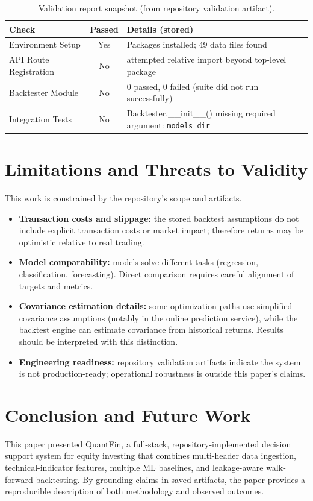 \documentclass{svproc}
\begin{document}
\begin{table}[h!]
\centering
\caption{Validation report snapshot (from repository validation artifact).}
\label{tab:validation}
\begin{tabular}{|l|c|p{8.0cm}|}
\hline
Check & Passed & Details (stored) \\
\hline
Environment Setup & Yes & Packages installed; 49 data files found \\
API Route Registration & No & attempted relative import beyond top-level package \\
Backtester Module & No & 0 passed, 0 failed (suite did not run successfully) \\
Integration Tests & No & Backtester.\_\_init\_\_() missing required argument: \texttt{models\_dir} \\
\hline
\end{tabular}
\end{table}

\section{Limitations and Threats to Validity}\label{sec:limits}
This work is constrained by the repository's scope and artifacts.
\begin{itemize}
\item \textbf{Transaction costs and slippage:} the stored backtest assumptions do not include explicit transaction costs or market impact; therefore returns may be optimistic relative to real trading.
\item \textbf{Model comparability:} models solve different tasks (regression, classification, forecasting). Direct comparison requires careful alignment of targets and metrics.
\item \textbf{Covariance estimation details:} some optimization paths use simplified covariance assumptions (notably in the online prediction service), while the backtest engine can estimate covariance from historical returns. Results should be interpreted with this distinction.
\item \textbf{Engineering readiness:} repository validation artifacts indicate the system is not production-ready; operational robustness is outside this paper's claims.
\end{itemize}

\section{Conclusion and Future Work}\label{sec:con}
This paper presented QuantFin, a full-stack, repository-implemented decision support system for equity investing that combines multi-header data ingestion, technical-indicator features, multiple ML baselines, and leakage-aware walk-forward backtesting. By grounding claims in saved artifacts, the paper provides a reproducible description of both methodology and observed outcomes.
\end{document}
